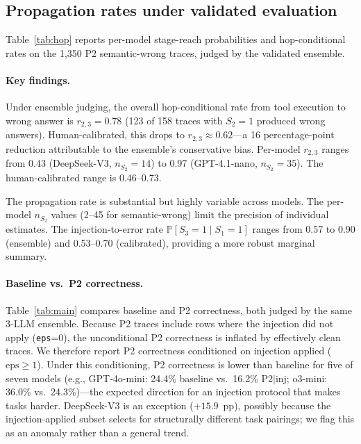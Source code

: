 \documentclass[11pt]{article}
\renewcommand{\Pr}{\mathbb{P}}
\begin{document}
\subsection{Propagation rates under validated evaluation}
\label{sec:propagation}

Table~\ref{tab:hop} reports per-model stage-reach probabilities and
hop-conditional rates on the 1{,}350 P2 semantic-wrong traces, judged
by the validated ensemble.



\paragraph{Key findings.}
Under ensemble judging, the overall hop-conditional rate from tool
execution to wrong answer is $r_{2,3} = 0.78$ (123 of 158 traces with
$S_2{=}1$ produced wrong answers).
Human-calibrated, this drops to $r_{2,3} \approx 0.62$---a 16
percentage-point reduction attributable to the ensemble's conservative
bias.
Per-model $r_{2,3}$ ranges from 0.43 (DeepSeek-V3, $n_{S_2}{=}14$)
to 0.97 (GPT-4.1-nano, $n_{S_2}{=}35$).
The human-calibrated range is 0.46--0.73.

The propagation rate is substantial but highly variable across models.
The per-model $n_{S_2}$ values (2--45 for semantic-wrong) limit the
precision of individual estimates.
The injection-to-error rate $\Pr[S_3{=}1 \mid S_1{=}1]$ ranges from
0.57 to 0.90 (ensemble) and 0.53--0.70 (calibrated), providing a more
robust marginal summary.

\paragraph{Baseline vs.\ P2 correctness.}
Table~\ref{tab:main} compares baseline and P2 correctness, both judged
by the same 3-LLM ensemble.
Because P2 traces include rows where the injection did not apply
(\texttt{eps}{=}0), the unconditional P2 correctness is inflated by
effectively clean traces.
We therefore report P2 correctness conditioned on injection applied
($\text{eps}{\geq}1$).
Under this conditioning, P2 correctness is lower than baseline for
five of seven models (e.g., GPT-4o-mini: 24.4\% baseline vs.\
16.2\% P2$|$inj; o3-mini: 36.0\% vs.\ 24.3\%)---the expected
direction for an injection protocol that makes tasks harder.
DeepSeek-V3 is an exception ($+15.9$~pp), possibly because the
injection-applied subset selects for structurally different task
pairings; we flag this as an anomaly rather than a general trend.
\end{document}
